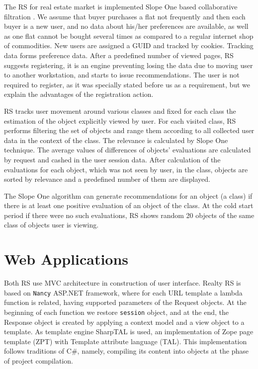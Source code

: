 \documentclass[conference,a4]{IEEEtran}
\begin{document}
The RS for real estate market is implemented Slope One based collaborative filtration \cite{br1}.  We assume that buyer purchases a flat not frequently and then each buyer is a new user, and no data about his/her preferences are available, as well as one flat cannot be bought several times as compared to a regular internet shop of commodities.  New users are assigned a GUID and tracked by cookies.  Tracking data forms preference data.  After a predefined number of viewed pages, RS suggests registering, it is an engine preventing losing the data due to moving user to another workstation, and starts to issue recommendations.  The user is not required to register, as it was specially stated before us as a requirement, but we explain the advantages of the registration action.

RS tracks user movement around various classes and fixed for each class the estimation of the object explicitly viewed by user. For each visited class, RS performs filtering the set of objects and range them according to all collected user data in the context of the class.  The relevance is calculated by Slope One technique.  The average values of differences of objects' evaluations are calculated by request and cashed in the user session data. After calculation of the evaluations for each object, which was not seen by user, in the class, objects are sorted by relevance and a predefined number of them are displayed.

The Slope One algorithm can generate recommendations for an object (a class) if there is at least one positive evaluation of an object of the class.  At the cold start period if there were no such evaluations, RS shows random 20 objects of the same class of objects user is viewing.

\section{Web Applications}

Both RS use MVC \cite{friman15,cchadvik20} architecture in construction of user interface.  Realty RS is based on \texttt{Nancy} ASP.NET framework, where for each URL template a lambda function is related, having supported parameters of the Request objects.  At the beginning of each function we restore \texttt{session} object, and at the end, the Response object is created by applying a context model and a view object to a template.  As template engine SharpTAL is used, an implementation of Zope page template (ZPT) with Template attribute language (TAL).  This implementation follows traditions of C\#, namely, compiling its content into objects at the phase of project compilation.
\end{document}
